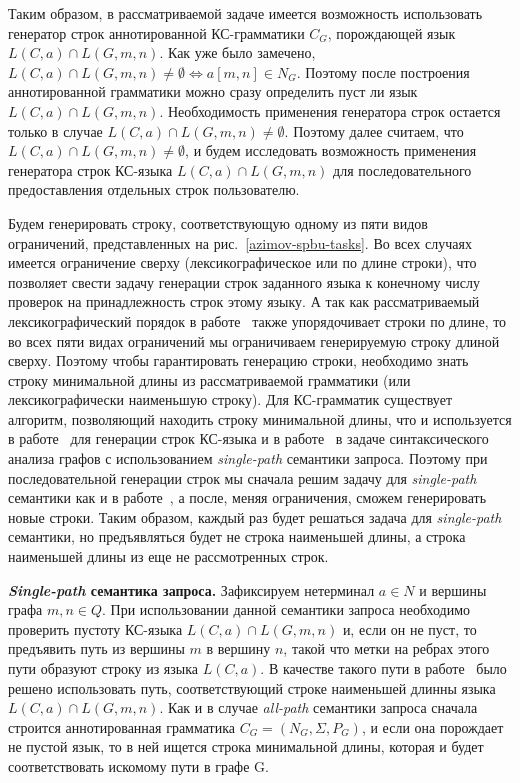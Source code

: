 Таким образом, в рассматриваемой задаче имеется возможность использовать генератор строк аннотированной КС-грамматики $C_{G}$, порождающей язык $L(C,a) \cap L(G,m,n)$. Как уже было замечено, $L(C,a) \cap L(G,m,n) \ne \emptyset \Leftrightarrow a[m,n] \in N_{G}$. Поэтому после построения аннотированной грамматики можно сразу определить пуст ли язык $L(C,a) \cap L(G,m,n)$. Необходимость применения генератора строк остается только в случае $L(C,a) \cap L(G,m,n) \ne \emptyset$. Поэтому далее считаем, что $L(C,a) \cap L(G,m,n) \ne \emptyset$, и будем исследовать возможность применения генератора строк КС-языка $L(C,a) \cap L(G,m,n)$ для последовательного предоставления отдельных строк пользователю.

Будем генерировать строку, соответствующую одному из пяти видов ограничений, представленных на рис.~\ref{azimov-spbu-tasks}. Во всех случаях имеется ограничение сверху (лексикографическое или по длине строки), что позволяет свести задачу генерации строк заданного языка к конечному числу проверок на принадлежность строк этому языку. А так как рассматриваемый лексикографический порядок в работе~\cite{azimov-spbu-Okhotin} также упорядочивает строки по длине, то во всех пяти видах ограничений мы ограничиваем генерируемую строку длиной сверху. Поэтому чтобы гарантировать генерацию строки, необходимо знать строку минимальной длины из рассматриваемой грамматики (или лексикографически наименьшую строку). Для КС-грамматик существует алгоритм, позволяющий находить строку минимальной длины, что и используется в работе~\cite{azimov-spbu-Okhotin} для генерации строк КС-языка и в работе~\cite{azimov-spbu-hellings2} в задаче синтаксического анализа графов с использованием \textit{single-path} семантики запроса. Поэтому при последовательной генерации строк мы сначала решим задачу для \textit{single-path} семантики как и в работе~\cite{azimov-spbu-hellings2}, а после, меняя ограничения, сможем генерировать новые строки. Таким образом, каждый раз будет решаться задача для \textit{single-path} семантики, но предъявляться будет не строка наименьшей длины, а строка наименьшей длины из еще не рассмотренных строк.

\textbf{\textit{Single-path} семантика запроса.} Зафиксируем нетерминал $a \in N$ и вершины графа $m, n \in Q$. При использовании данной семантики запроса необходимо проверить пустоту КС-языка $L(C,a) \cap L(G,m,n)$ и, если он не пуст, то предъявить путь из вершины $m$ в вершину $n$, такой что метки на ребрах этого пути образуют строку из языка $L(C,a)$. В качестве такого пути в работе~\cite{azimov-spbu-hellings2} было решено использовать путь, соответствующий строке наименьшей длинны языка $L(C,a) \cap L(G,m,n)$. Как и в случае \textit{all-path} семантики запроса сначала строится аннотированная грамматика $C_{G} = (N_{G}, \Sigma, P_{G})$, и если она порождает не пустой язык, то в ней ищется строка минимальной длины, которая и будет соответствовать искомому пути в графе G.

